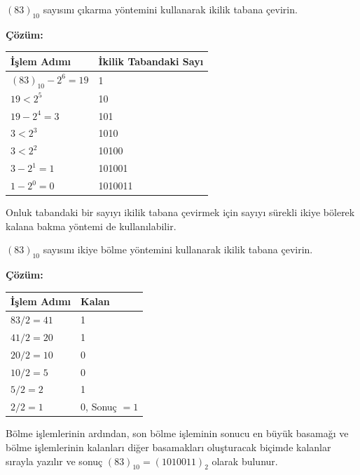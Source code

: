 \begin{ornek}[A.3]
$(83)_{10}$ sayısını çıkarma yöntemini kullanarak ikilik tabana çevirin.

\textbf{Çözüm:}

\begin{table}[H]
\centering
\begin{tabular}{ll}
\toprule
\textbf{İşlem Adımı} & \textbf{İkilik Tabandaki Sayı} \\
\midrule
$(83)_{10} - 2^6 = 19$ & 1 \\
$19 < 2^5$ & 10 \\
$19 - 2^4 = 3$ & 101 \\
$3 < 2^3$ & 1010 \\
$3 < 2^2$ & 10100 \\
$3 - 2^1 = 1$ & 101001 \\
$1 - 2^0 = 0$ & 1010011 \\
\bottomrule
\end{tabular}
\end{table}
\end{ornek}

Onluk tabandaki bir sayıyı ikilik tabana çevirmek için sayıyı sürekli ikiye bölerek kalana bakma yöntemi de kullanılabilir.

\begin{ornek}[A.4]
$(83)_{10}$ sayısını ikiye bölme yöntemini kullanarak ikilik tabana çevirin.

\textbf{Çözüm:}

\begin{table}[H]
\centering
\begin{tabular}{ll}
\toprule
\textbf{İşlem Adımı} & \textbf{Kalan} \\
\midrule
$83 / 2 = 41$ & 1 \\
$41 / 2 = 20$ & 1 \\
$20 / 2 = 10$ & 0 \\
$10 / 2 = 5$ & 0 \\
$5 / 2 = 2$ & 1 \\
$2 / 2 = 1$ & 0, Sonuç $= 1$ \\
\bottomrule
\end{tabular}
\end{table}

Bölme işlemlerinin ardından, son bölme işleminin sonucu en büyük basamağı ve bölme işlemlerinin kalanları diğer basamakları oluşturacak biçimde kalanlar sırayla yazılır ve sonuç $(83)_{10} = (1010011)_2$ olarak bulunur.
\end{ornek}

